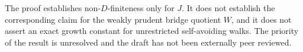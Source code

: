 \documentclass[11pt]{article}
\theoremstyle{definition}
\theoremstyle{remark}
\begin{document}
The proof establishes non-\(D\)-finiteness only for \(J\).  It does not
establish the corresponding claim for the weakly prudent bridge quotient
\(W\), and it does not assert an exact growth constant for unrestricted
self-avoiding walks.  The priority of the result is unresolved and the
draft has not been externally peer reviewed.



\end{document}
